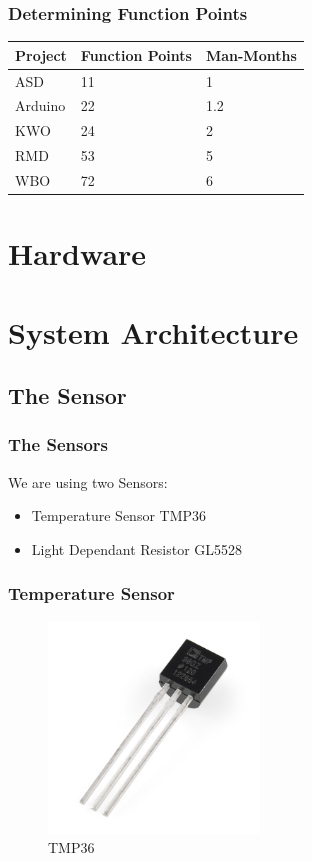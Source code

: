 \documentclass{beamer}
\begin{document}
\frame
{
	\frametitle{Determining Function Points}
	\begin{tabular}{|l|l|l|}
	\hline
	Project & Function Points 	& Man-Months 	\\ \hline
	ASD 	& 11 				& 1				\\ \hline
	Arduino	& 22				& 1.2			\\ \hline
	KWO 	& 24 				& 2				\\ \hline
	RMD 	& 53 				& 5				\\ \hline
	WBO 	& 72 				& 6				\\ \hline
	\end{tabular}
}

\section{Hardware}
\frame
{

}


\section{System Architecture}
\subsection{The Sensor}
\frame
{
	\frametitle{The Sensors}
	We are using two Sensors:	
	\begin{itemize}
	\item Temperature Sensor TMP36
	\item Light Dependant Resistor GL5528	
	\end{itemize}
}

\frame
{
	\frametitle{Temperature Sensor}
	\begin{figure}[h!]
  		\centering
    	\includegraphics[width=0.5\textwidth]{../Images/Temp.jpg}
		\caption{TMP36}
	\end{figure}
}
\end{document}
